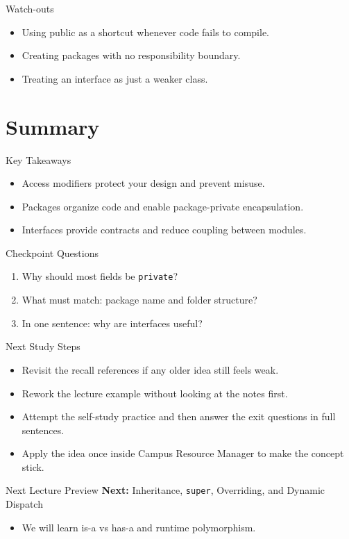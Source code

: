 \documentclass{beamer}
\begin{document}
\begin{frame}{Watch-outs}
\begin{itemize}[<+->]
  \item Using public as a shortcut whenever code fails to compile.
  \item Creating packages with no responsibility boundary.
  \item Treating an interface as just a weaker class.
\end{itemize}
  \slidesources{\OOPSUnitIISources}
\end{frame}

\section{Summary}
\label{sec:summary}

\begin{frame}{Key Takeaways}
  \begin{itemize}[<+->]
    \item Access modifiers protect your design and prevent misuse.
    \item Packages organize code and enable package-private encapsulation.
    \item Interfaces provide contracts and reduce coupling between modules.
  \end{itemize}
  \slidesources{\OOPSUnitIISources}
\end{frame}

\begin{frame}{Checkpoint Questions}
  \begin{enumerate}[<+->]
    \item Why should most fields be \texttt{private}?
    \item What must match: package name and folder structure?
    \item In one sentence: why are interfaces useful?
  \end{enumerate}
  \slidesources{\OOPSUnitIISources}
\end{frame}

\begin{frame}{Next Study Steps}
\begin{itemize}[<+->]
  \item Revisit the recall references if any older idea still feels weak.
  \item Rework the lecture example without looking at the notes first.
  \item Attempt the self-study practice and then answer the exit questions in full sentences.
  \item Apply the idea once inside Campus Resource Manager to make the concept stick.
\end{itemize}
  \slidesources{\OOPSUnitIISources}
\end{frame}

\begin{frame}{Next Lecture Preview}
  \textbf{Next:} Inheritance, \texttt{super}, Overriding, and Dynamic Dispatch
  \vspace{0.6em}
  \begin{itemize}[<+->]
    \item We will learn is-a vs has-a and runtime polymorphism.
  \end{itemize}
  \slidesources{\OOPSUnitIISources}
\end{frame}
\end{document}
